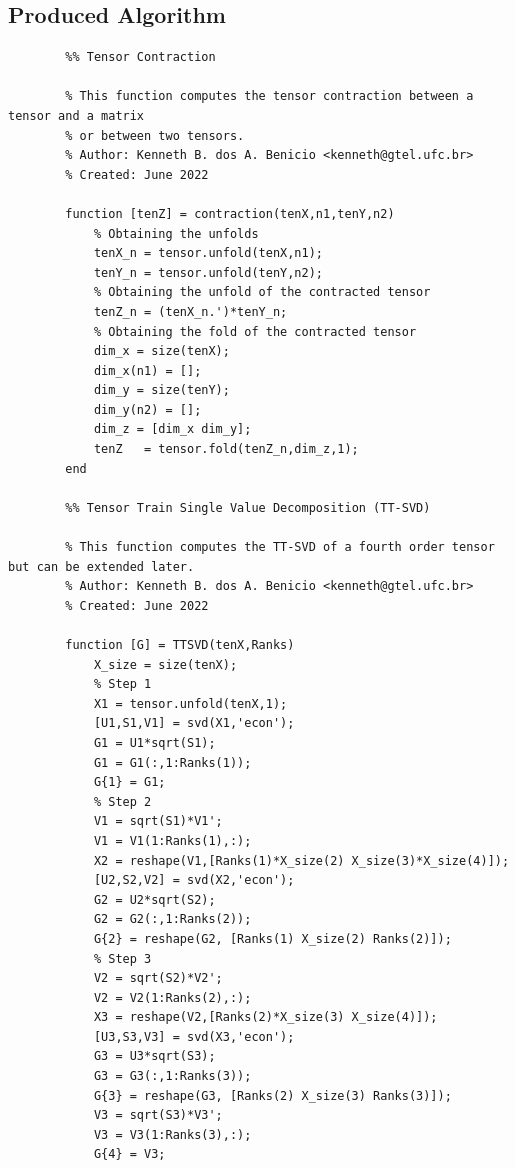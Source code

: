 \documentclass[a4paper,10pt]{article}
\begin{document}
    \newpage
    \subsection*{Produced Algorithm}

    \begin{verbatim}
        %% Tensor Contraction

        % This function computes the tensor contraction between a tensor and a matrix
        % or between two tensors.   
        % Author: Kenneth B. dos A. Benicio <kenneth@gtel.ufc.br>
        % Created: June 2022

        function [tenZ] = contraction(tenX,n1,tenY,n2)
            % Obtaining the unfolds
            tenX_n = tensor.unfold(tenX,n1);
            tenY_n = tensor.unfold(tenY,n2);
            % Obtaining the unfold of the contracted tensor
            tenZ_n = (tenX_n.')*tenY_n;
            % Obtaining the fold of the contracted tensor
            dim_x = size(tenX);
            dim_x(n1) = [];
            dim_y = size(tenY);
            dim_y(n2) = [];
            dim_z = [dim_x dim_y];
            tenZ   = tensor.fold(tenZ_n,dim_z,1);
        end

        %% Tensor Train Single Value Decomposition (TT-SVD)

        % This function computes the TT-SVD of a fourth order tensor but can be extended later.   
        % Author: Kenneth B. dos A. Benicio <kenneth@gtel.ufc.br>
        % Created: June 2022

        function [G] = TTSVD(tenX,Ranks)
            X_size = size(tenX);
            % Step 1
            X1 = tensor.unfold(tenX,1);
            [U1,S1,V1] = svd(X1,'econ');
            G1 = U1*sqrt(S1);
            G1 = G1(:,1:Ranks(1));
            G{1} = G1;
            % Step 2
            V1 = sqrt(S1)*V1';
            V1 = V1(1:Ranks(1),:);
            X2 = reshape(V1,[Ranks(1)*X_size(2) X_size(3)*X_size(4)]);
            [U2,S2,V2] = svd(X2,'econ');
            G2 = U2*sqrt(S2);
            G2 = G2(:,1:Ranks(2));
            G{2} = reshape(G2, [Ranks(1) X_size(2) Ranks(2)]);
            % Step 3
            V2 = sqrt(S2)*V2';
            V2 = V2(1:Ranks(2),:);
            X3 = reshape(V2,[Ranks(2)*X_size(3) X_size(4)]);
            [U3,S3,V3] = svd(X3,'econ');
            G3 = U3*sqrt(S3);
            G3 = G3(:,1:Ranks(3));
            G{3} = reshape(G3, [Ranks(2) X_size(3) Ranks(3)]);
            V3 = sqrt(S3)*V3';
            V3 = V3(1:Ranks(3),:);
            G{4} = V3;


\end{verbatim}
\end{document}
